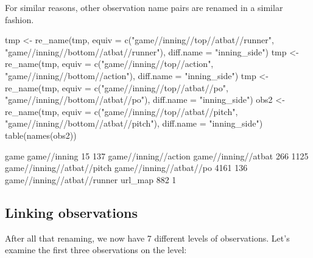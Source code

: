 \begin{article}
For similar reasons, other observation name pairs are renamed in a
similar fashion.
%
\begin{Schunk}
\begin{Sinput}
tmp <- re_name(tmp, equiv = c("game//inning//top//atbat//runner",                             
  "game//inning//bottom//atbat//runner"), diff.name = "inning_side")
tmp <- re_name(tmp, equiv = c("game//inning//top//action",                             
  "game//inning//bottom//action"), diff.name = "inning_side")  
tmp <- re_name(tmp, equiv = c("game//inning//top//atbat//po",                            
  "game//inning//bottom//atbat//po"), diff.name = "inning_side")
obs2 <- re_name(tmp, equiv = c("game//inning//top//atbat//pitch",                             
  "game//inning//bottom//atbat//pitch"), diff.name = "inning_side") 
table(names(obs2))
\end{Sinput}
\begin{Soutput}

                       game                game//inning 
                         15                         137 
       game//inning//action         game//inning//atbat 
                        266                        1125 
 game//inning//atbat//pitch     game//inning//atbat//po 
                       4161                         136 
game//inning//atbat//runner                     url_map 
                        882                           1 
\end{Soutput}
\end{Schunk}
%


\subsection{Linking observations}

After all that renaming, we now have 7
different levels of observations. Let's examine the first three observations
on the  level:
%
\begin{Schunk}
\end{Schunk}
%


\end{article}

